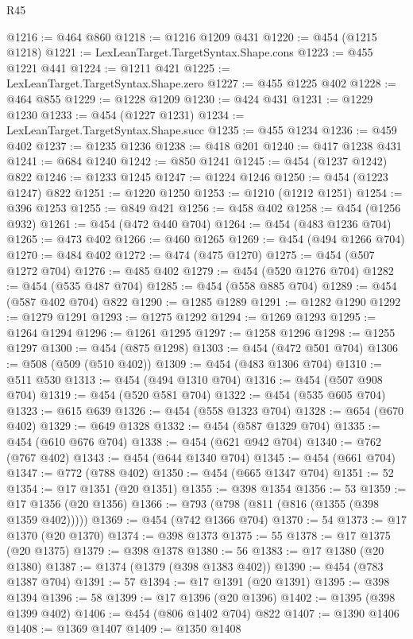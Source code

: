 \begin{lexlean}{R45}
\begin{coremodule}
{{{{{{{{{{{{{{{{{{{{{{{{{{{{{{{{{{{{{{{{{{{{{{{{{{{{{{{{{{{{{{{{{{{{{{{{{{{{{{{{{{{{{{{{{{{@1216 := @464 @860
@1218 := @1216 @1209 @431
@1220 := @454 (@1215 @1218)
@1221 := LexLeanTarget.TargetSyntax.Shape.cons
@1223 := @455 @1221 @441
@1224 := @1211 @421
@1225 := LexLeanTarget.TargetSyntax.Shape.zero
@1227 := @455 @1225 @402
@1228 := @464 @855
@1229 := @1228 @1209
@1230 := @424 @431
@1231 := @1229 @1230
@1233 := @454 (@1227 @1231)
@1234 := LexLeanTarget.TargetSyntax.Shape.succ
@1235 := @455 @1234
@1236 := @459 @402
@1237 := @1235 @1236
@1238 := @418 @201
@1240 := @417 @1238 @431
@1241 := @684 @1240
@1242 := @850 @1241
@1245 := @454 (@1237 @1242) @822
@1246 := @1233 @1245
@1247 := @1224 @1246
@1250 := @454 (@1223 @1247) @822
@1251 := @1220 @1250
@1253 := @1210 (@1212 @1251)
@1254 := @396 @1253
@1255 := @849 @421
@1256 := @458 @402
@1258 := @454 (@1256 @932)
@1261 := @454 (@472 @440 @704)
@1264 := @454 (@483 @1236 @704)
@1265 := @473 @402
@1266 := @460 @1265
@1269 := @454 (@494 @1266 @704)
@1270 := @484 @402
@1272 := @474 (@475 @1270)
@1275 := @454 (@507 @1272 @704)
@1276 := @485 @402
@1279 := @454 (@520 @1276 @704)
@1282 := @454 (@535 @487 @704)
@1285 := @454 (@558 @885 @704)
@1289 := @454 (@587 @402 @704) @822
@1290 := @1285 @1289
@1291 := @1282 @1290
@1292 := @1279 @1291
@1293 := @1275 @1292
@1294 := @1269 @1293
@1295 := @1264 @1294
@1296 := @1261 @1295
@1297 := @1258 @1296
@1298 := @1255 @1297
@1300 := @454 (@875 @1298)
@1303 := @454 (@472 @501 @704)
@1306 := @508 (@509 (@510 @402))
@1309 := @454 (@483 @1306 @704)
@1310 := @511 @530
@1313 := @454 (@494 @1310 @704)
@1316 := @454 (@507 @908 @704)
@1319 := @454 (@520 @581 @704)
@1322 := @454 (@535 @605 @704)
@1323 := @615 @639
@1326 := @454 (@558 @1323 @704)
@1328 := @654 (@670 @402)
@1329 := @649 @1328
@1332 := @454 (@587 @1329 @704)
@1335 := @454 (@610 @676 @704)
@1338 := @454 (@621 @942 @704)
@1340 := @762 (@767 @402)
@1343 := @454 (@644 @1340 @704)
@1345 := @454 (@661 @704)
@1347 := @772 (@788 @402)
@1350 := @454 (@665 @1347 @704)
@1351 := 52
@1354 := @17 @1351 (@20 @1351)
@1355 := @398 @1354
@1356 := 53
@1359 := @17 @1356 (@20 @1356)
@1366 := @793 (@798 (@811 (@816 (@1355 (@398 @1359 @402)))))
@1369 := @454 (@742 @1366 @704)
@1370 := 54
@1373 := @17 @1370 (@20 @1370)
@1374 := @398 @1373
@1375 := 55
@1378 := @17 @1375 (@20 @1375)
@1379 := @398 @1378
@1380 := 56
@1383 := @17 @1380 (@20 @1380)
@1387 := @1374 (@1379 (@398 @1383 @402))
@1390 := @454 (@783 @1387 @704)
@1391 := 57
@1394 := @17 @1391 (@20 @1391)
@1395 := @398 @1394
@1396 := 58
@1399 := @17 @1396 (@20 @1396)
@1402 := @1395 (@398 @1399 @402)
@1406 := @454 (@806 @1402 @704) @822
@1407 := @1390 @1406
@1408 := @1369 @1407
@1409 := @1350 @1408
}}}}}}}}}}}}}}}}}}}}}}}}}}}}}}}}}}}}}}}}}}}}}}}}}}}}}}}}}}}}}}}}}}}}}}}}}}}}}}}}}}}}}}}}}}}
\end{coremodule}
\end{lexlean}
